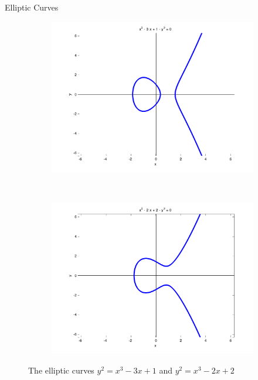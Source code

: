 \documentclass[final]{beamer}
\begin{document}
\begin{frame}[fragile]
\begin{columns}[t]
\begin{column}{.3\linewidth}
\begin{block}{Elliptic Curves}
\begin{figure}[h]
		\begin{subfigure}{.5\linewidth}
			\centering
			\includegraphics[width=1.0\linewidth]{../images/ec1.png}
		\end{subfigure}%
		~%
		\begin{subfigure}{.5\linewidth}
			\centering
			\includegraphics[width=1.0\linewidth]{../images/ec4g.png}
		\end{subfigure}

		\caption{The elliptic curves $y^2 = x^3 - 3x + 1$ and $y^2 = x^3 - 2x + 2$}

		\label{fig:ec-plot}
		\end{figure}

	\end{block}


\end{column}
\end{columns}
\end{frame}
\end{document}
